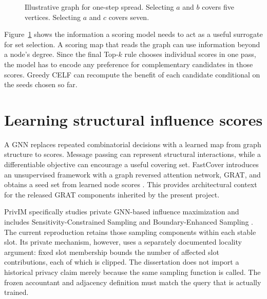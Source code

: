 \begin{figure}[htbp]
\centering
{}
\caption[Overlapping and complementary seed neighborhoods]{Illustrative graph for one-step spread. Selecting $a$ and $b$ covers five vertices. Selecting $a$ and $c$ covers seven.}
\label{fig:seed-overlap}
\end{figure}

Figure~\ref{fig:seed-overlap} shows the information a scoring model needs to act as a useful surrogate for set selection. A scoring map that reads the graph can use information beyond a node's degree. Since the final Top-$k$ rule chooses individual scores in one pass, the model has to encode any preference for complementary candidates in those scores. Greedy CELF can recompute the benefit of each candidate conditional on the seeds chosen so far.

\section{Learning structural influence scores}
A GNN replaces repeated combinatorial decisions with a learned map from graph structure to scores. Message passing can represent structural interactions, while a differentiable objective can encourage a useful covering set. FastCover introduces an unsupervised framework with a graph reversed attention network, GRAT, and obtains a seed set from learned node scores \cite{ni2021}. This provides architectural context for the released GRAT components inherited by the present project.

PrivIM specifically studies private GNN-based influence maximization and includes Sensitivity-Constrained Sampling and Boundary-Enhanced Sampling \cite{hou2025}. The current reproduction retains those sampling components within each stable slot. Its private mechanism, however, uses a separately documented locality argument: fixed slot membership bounds the number of affected slot contributions, each of which is clipped. The dissertation does not import a historical privacy claim merely because the same sampling function is called. The frozen accountant and adjacency definition must match the query that is actually trained.

